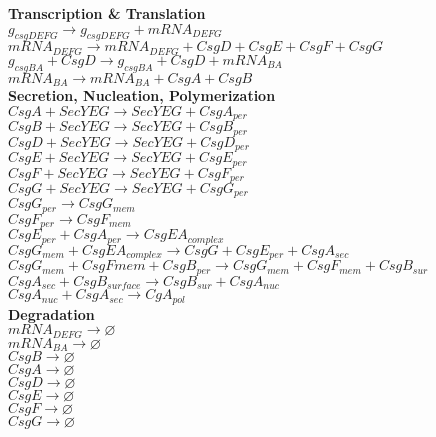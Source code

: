 \documentclass[11pt, oneside]{article}   	%
\begin{document}
\begin{center}

\textbf{Transcription \& Translation} \\
$g_{csgDEFG} \rightarrow g_{csgDEFG} + mRNA_{DEFG}$ \\
$mRNA_{DEFG} \rightarrow mRNA_{DEFG} + CsgD + CsgE + CsgF + CsgG$ \\
$g_{csgBA} + CsgD \rightarrow  g_{csgBA} + CsgD + mRNA_{BA} $ \\
$mRNA_{BA} \rightarrow mRNA_{BA} + CsgA + CsgB$ \\ 
\hfill \break
\textbf{Secretion, Nucleation, Polymerization} \\
$CsgA + SecYEG \rightarrow SecYEG + CsgA_{per}$ \\
$CsgB + SecYEG \rightarrow SecYEG + CsgB_{per}$ \\
$CsgD + SecYEG \rightarrow SecYEG + CsgD_{per}$ \\
$CsgE + SecYEG \rightarrow SecYEG + CsgE_{per}$ \\
$CsgF + SecYEG \rightarrow SecYEG + CsgF_{per}$ \\
$CsgG + SecYEG \rightarrow SecYEG + CsgG_{per}$ \\
$CsgG_{per} \rightarrow CsgG_{mem}$ \\
$CsgF_{per} \rightarrow CsgF_{mem}$ \\
$CsgE_{per} + CsgA_{per} \rightarrow CsgEA_{complex}$ \\
$CsgG_{mem} + CsgEA_{complex} \rightarrow CsgG + CsgE_{per} + CsgA_{sec}$ \\
$CsgG_{mem} + CsgF{mem} + CsgB_{per} \rightarrow CsgG_{mem} + CsgF_{mem} + CsgB_{sur}$ \\
$CsgA_{sec} + CsgB_{surface} \rightarrow CsgB_{sur} + CsgA_{nuc}$ \\ 
$CsgA_{nuc} + CsgA_{sec} \rightarrow CgA_{pol}$ \\

\hfill \break
\textbf{Degradation} \\
$mRNA_{DEFG} \rightarrow \varnothing$ \\ 
$mRNA_{BA} \rightarrow \varnothing$ \\ 
$CsgB \rightarrow \varnothing$ \\ 
$CsgA \rightarrow \varnothing$ \\
$CsgD \rightarrow \varnothing$ \\
$CsgE \rightarrow \varnothing$ \\
$CsgF \rightarrow \varnothing$ \\
$CsgG \rightarrow \varnothing$ \\


\end{center}
\end{document}
